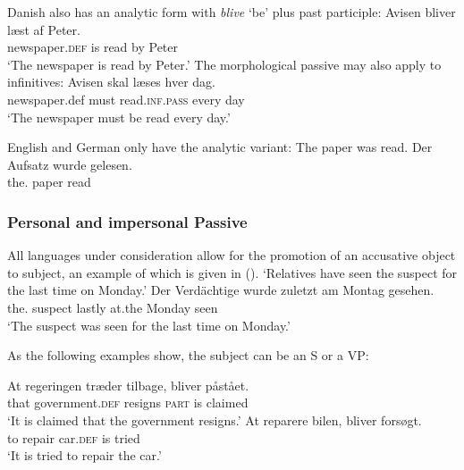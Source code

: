 \noindent
Danish also has an analytic form with \emph{blive} `be' plus past participle: 
\ea
\gll Avisen                 bliver læst af Peter.\\
     newspaper.\textsc{def} is     read by Peter\\\danish
\glt `The newspaper is read by Peter.'
\z
The morphological passive may also apply to infinitives:
\ea
\gll Avisen skal læses hver dag.\\
     newspaper.def must read.\textsc{inf}.\textsc{pass} every day\\\danish
\glt `The newspaper must be read every day.'
\z


English and German only have the analytic variant:
\eal
\ex The paper was read.
\ex 
\gll Der        Aufsatz wurde  gelesen.\\
     the.\NOM{} paper   \AUX{} read\\\german
\zl    





\subsubsection{Personal and impersonal Passive}
\label{sec-impersonal-passive-phen}

All languages under consideration allow for the promotion of an accusative object to subject, an
example of which is given in ().
\eal
\ex
{}
\glt `Relatives have seen the suspect for the last time on Monday.'
\ex 
\gll Der        Verdächtige wurde  zuletzt am Montag gesehen.\\
     the.\NOM{} suspect     \AUX{} lastly at.the Monday seen\\
\glt `The suspect was seen for the last time on Monday.'
\zl

\noindent
As the following examples show, the subject can be an S or a VP:

\eal
\ex
\gll At regeringen træder tilbage, bliver påstået.\\
     that government.\textsc{def} resigns \textsc{part} is claimed\\\danish
\glt `It is claimed that the government resigns.'
\ex
\gll At reparere bilen, bliver forsøgt.\\
     to repair car.\textsc{def} is tried\\
\glt `It is tried to repair the car.'
\zl

